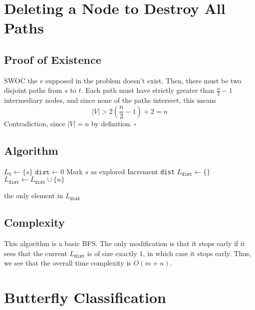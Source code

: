 \documentclass[12pt]{article}
\begin{document}
\pagebreak

\section{Deleting a Node to Destroy All Paths}

\subsection{Proof of Existence}

SWOC the $v$ supposed in the problem doesn't exist.
Then, there must be two disjoint paths from $s$ to $t$.
Each path must have strictly greater than $\frac{n}{2}-1$ intermediary nodes,
and since none of the paths intersect, this means
\[|V| > 2\left(\frac{n}{2}-1\right)+2 = n\]
Contradiction, since $|V|=n$ by definition. $\square$

\subsection{Algorithm}

\begin{algorithmic}[1]
    \State $L_0 \gets \{s\}$
    \State $\texttt{dist} \gets 0$
    \State Mark $s$ as explored
        \State Increment \texttt{dist}
        \State $L_{\texttt{dist}} \gets \{\}$
                    \State $L_{\texttt{dist}} \gets L_{\texttt{dist}} \cup \{n\}$
                \EndIf
            \EndFor
        \EndFor

        \item[]
            \State \Return the only element in $L_{\texttt{dist}}$
        \EndIf
    \EndWhile
\end{algorithmic}

\subsection{Complexity}

This algorithm is a basic BFS.
The only modification is that it stops early if it sees that the current
$L_{\texttt{dist}}$ is of size exactly $1$, in which case it stops early.
Thus, we see that the overall time complexity is $O(m+n)$.

\pagebreak

\section{Butterfly Classification}
\end{document}
